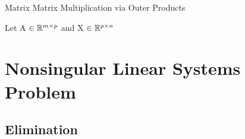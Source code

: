 \documentclass[12pt]{article}
\begin{document}
\begin{defin}{Matrix Matrix Multiplication via Outer Products}

    Let A $\in \mathbb{R}^{m \times p}$ and X $\in \mathbb{R}^{p \times n}$
\end{defin}




\section{Nonsingular Linear Systems Problem}
\subsection{Elimination}
\end{document}
